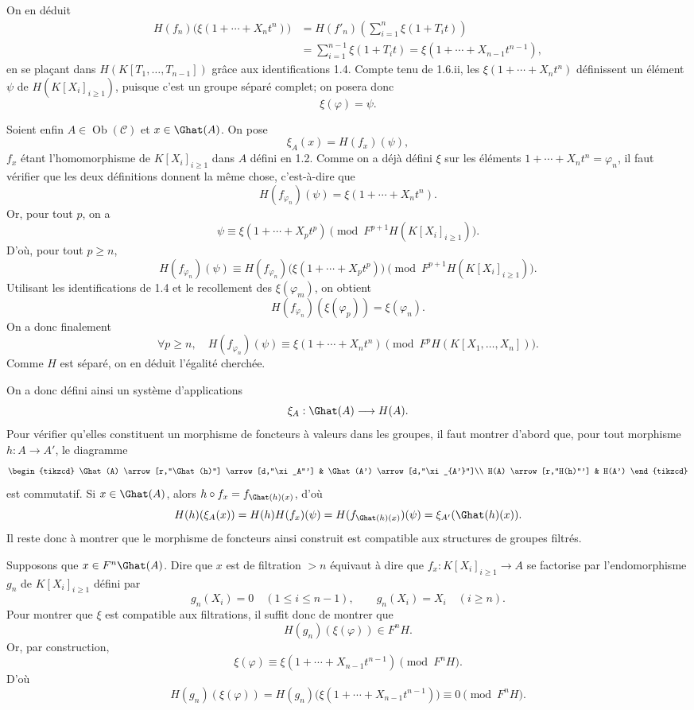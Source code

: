 \documentclass[11pt]{article}
\begin{document}
On en déduit
\[
\begin{aligned}
H(f_n)\bigl(\xi(1+\cdots+X_nt^n)\bigr)
&=H(f'_n)\left(\sum_{i=1}^n \xi(1+T_it)\right)\\
&=\sum_{i=1}^{n-1}\xi(1+T_it)
=\xi(1+\cdots+X_{n-1}t^{n-1}),
\end{aligned}
\]
en se plaçant dans \(H(K[T_1,\ldots,T_{n-1}])\) grâce aux identifications 1.4. Compte tenu de 1.6.ii, les \(\xi(1+\cdots+X_nt^n)\) définissent un élément \(\psi\) de \(H(K[X_i]_{i\geq1})\), puisque c'est un groupe séparé complet; on posera donc
\[
  \xi(\varphi)=\psi .
\]

Soient enfin \(A\in\operatorname{Ob}(\mathcal C)\) et \(x\in\Ghat(A)\). On pose
\[
  \xi_A(x)=H(f_x)(\psi),
\]
\(f_x\) étant l'homomorphisme de \(K[X_i]_{i\geq 1}\) dans \(A\) défini en 1.2. Comme on a déjà défini \(\xi\) sur les éléments \(1+\cdots+X_nt^n=\varphi_n\), il faut vérifier que les deux définitions donnent la même chose, c'est-à-dire que
\[
  H(f_{\varphi_n})(\psi)=\xi(1+\cdots+X_nt^n).
\]
Or, pour tout \(p\), on a
\[
  \psi\equiv \xi(1+\cdots+X_pt^p)
  \pmod{F^{p+1}H(K[X_i]_{i\geq 1})}.
\]
D'où, pour tout \(p\geq n\),
\[
  H(f_{\varphi_n})(\psi)\equiv
  H(f_{\varphi_n})\bigl(\xi(1+\cdots+X_pt^p)\bigr)
  \pmod{F^{p+1}H(K[X_i]_{i\geq 1})}.
\]
Utilisant les identifications de 1.4 et le recollement des \(\xi(\varphi_m)\), on obtient
\[
  H(f_{\varphi_n})(\xi(\varphi_p))=\xi(\varphi_n).
\]
On a donc finalement
\[
  \forall p\geq n,\quad
  H(f_{\varphi_n})(\psi)\equiv \xi(1+\cdots+X_nt^n)
  \pmod{F^pH(K[X_1,\ldots,X_n])}.
\]
Comme \(H\) est séparé, on en déduit l'égalité cherchée.

On a donc défini ainsi un système d'applications
\[
  \xi_A:\Ghat(A)\longrightarrow H(A).
\]
Pour vérifier qu'elles constituent un morphisme de foncteurs à valeurs dans les groupes, il faut montrer d'abord que, pour tout morphisme \(h:A\to A'\), le diagramme
\[
\begin{tikzcd}
\Ghat(A) \arrow[r,"\Ghat(h)"] \arrow[d,"\xi_A"'] &
\Ghat(A') \arrow[d,"\xi_{A'}"]\\
H(A) \arrow[r,"H(h)"'] & H(A')
\end{tikzcd}
\]
est commutatif. Si \(x\in\Ghat(A)\), alors \(h\circ f_x=f_{\Ghat(h)(x)}\), d'où
\[
  H(h)(\xi_A(x))=H(h)H(f_x)(\psi)
  =H(f_{\Ghat(h)(x)})(\psi)=\xi_{A'}(\Ghat(h)(x)).
\]
Il reste donc à montrer que le morphisme de foncteurs ainsi construit est compatible aux structures de groupes filtrés.

Supposons que \(x\in F^n\Ghat(A)\). Dire que \(x\) est de filtration \(>n\) équivaut à dire que \(f_x:K[X_i]_{i\geq 1}\to A\) se factorise par l'endomorphisme \(g_n\) de \(K[X_i]_{i\geq 1}\) défini par
\[
  g_n(X_i)=0\quad (1\leq i\leq n-1),\qquad
  g_n(X_i)=X_i\quad (i\geq n).
\]
Pour montrer que \(\xi\) est compatible aux filtrations, il suffit donc de montrer que
\[
  H(g_n)(\xi(\varphi))\in F^nH.
\]
Or, par construction,
\[
  \xi(\varphi)\equiv \xi(1+\cdots+X_{n-1}t^{n-1})
  \pmod{F^nH}.
\]
D'où
\[
  H(g_n)(\xi(\varphi))
  =H(g_n)\bigl(\xi(1+\cdots+X_{n-1}t^{n-1})\bigr)
  \equiv0\pmod{F^nH}.
\]
\end{document}
